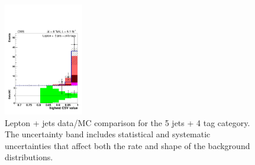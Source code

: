 \begin{figure}[hbtp]
\begin{center}
   \includegraphics[width=0.31\textwidth]{Figures/Analysis_1_Diagrams/d2MCPlots_first_highest_btag_cut8_j5_tge4_Combined_HtWgt.pdf}
   \hspace{0.055\textwidth}
   \caption{Lepton + jets data/MC comparison for the 5 jets + 4 tag category.  The uncertainty band includes statistical and systematic uncertainties that affect both the rate and shape of the background distributions.}
   \label{fig:lj_input_5j_4t_part1}
 \end{center}
\end{figure}

\clearpage

